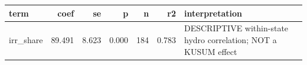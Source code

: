 \begin{tabular}{lrrrrrl}
\toprule
term & coef & se & p & n & r2 & interpretation \\
\midrule
irr_share & 89.491 & 8.623 & 0.000 & 184 & 0.783 & DESCRIPTIVE within-state hydro correlation; NOT a KUSUM effect \\
\bottomrule
\end{tabular}
